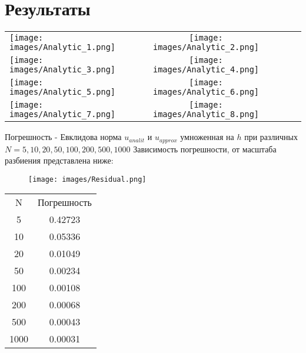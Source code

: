 \documentclass[12pt]{article}
\begin{document}
\section{Результаты}
\clearpage
\begin{table}\sffamily
\begin{tabular}{l*4{C}@{}}
\toprule
\texttt{[image: images/Analytic\_1.png]} &
\texttt{[image: images/Analytic\_2.png]} \\
\texttt{[image: images/Analytic\_3.png]} &
\texttt{[image: images/Analytic\_4.png]} \\
\texttt{[image: images/Analytic\_5.png]} &
\texttt{[image: images/Analytic\_6.png]} \\
\texttt{[image: images/Analytic\_7.png]} &
\texttt{[image: images/Analytic\_8.png]} \\

\end{tabular}
\end{table}

\clearpage
Погрешность - Евклидова норма $u_{analit}$ и $u_{approx}$ умноженная на $h$ при различных $N =
5, 10, 20, 50, 100, 200, 500, 1000$
Зависимость погрешности, от масштаба разбиения представлена ниже:
\begin{figure}[h]
    \centering
    \texttt{[image: images/Residual.png]}
\end{figure}

\begin{table}[h]
    \centering
    \begin{tabular}{c|c}
         N & Погрешность  \\
        5 &0.42723 \\
10 &0.05336\\
20 &0.01049\\
50 &0.00234\\
100 &0.00108\\
200 &0.00068\\
500 &0.00043\\
1000 &0.00031\\
    \end{tabular}

\end{table}
\end{document}
